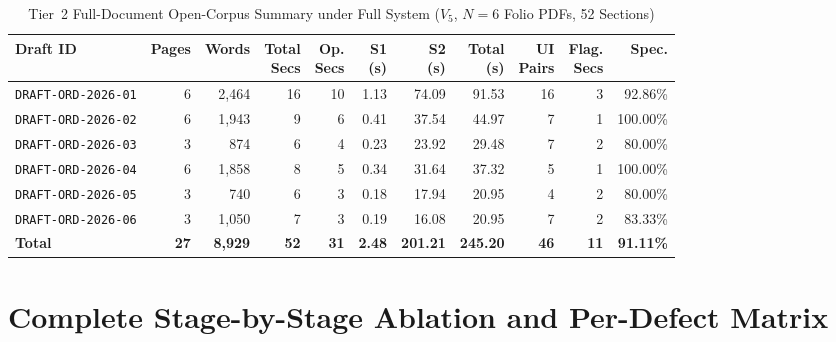 \begin{table}[htbp]
    \centering
    \scriptsize
    \setlength{\tabcolsep}{2.8pt}
    \renewcommand{\arraystretch}{0.88}
    \caption[Tier 2 Master Document-Level Open-Corpus Audit Summary]{Tier~2 Full-Document Open-Corpus Summary under Full System ($V_5$, $N = 6$ Folio PDFs, 52 Sections)}
    \label{tab:app_tier2_summary}
    \begin{tabular*}{\linewidth}{@{}l@{\extracolsep{\fill}}rrrrrrrrrr@{}}
        \toprule
        \textbf{Draft ID} & \textbf{Pages} & \textbf{Words} & \shortstack[r]{\textbf{Total}\\\textbf{Secs}} & \shortstack[r]{\textbf{Op.}\\\textbf{Secs}} & \shortstack[r]{\textbf{S1}\\\textbf{(s)}} & \shortstack[r]{\textbf{S2}\\\textbf{(s)}} & \shortstack[r]{\textbf{Total}\\\textbf{(s)}} & \shortstack[r]{\textbf{UI}\\\textbf{Pairs}} & \shortstack[r]{\textbf{Flag.}\\\textbf{Secs}} & \textbf{Spec.} \\
        \midrule
        \texttt{DRAFT-ORD-2026-01} & 6 & 2,464 & 16 & 10 & 1.13 & 74.09 & 91.53 & 16 & 3 & 92.86\% \\
        \texttt{DRAFT-ORD-2026-02} & 6 & 1,943 & 9 & 6 & 0.41 & 37.54 & 44.97 & 7 & 1 & 100.00\% \\
        \texttt{DRAFT-ORD-2026-03} & 3 & 874 & 6 & 4 & 0.23 & 23.92 & 29.48 & 7 & 2 & 80.00\% \\
        \texttt{DRAFT-ORD-2026-04} & 6 & 1,858 & 8 & 5 & 0.34 & 31.64 & 37.32 & 5 & 1 & 100.00\% \\
        \texttt{DRAFT-ORD-2026-05} & 3 & 740 & 6 & 3 & 0.18 & 17.94 & 20.95 & 4 & 2 & 80.00\% \\
        \texttt{DRAFT-ORD-2026-06} & 3 & 1,050 & 7 & 3 & 0.19 & 16.08 & 20.95 & 7 & 2 & 83.33\% \\
        \midrule
        \textbf{Total} & \textbf{27} & \textbf{8,929} & \textbf{52} & \textbf{31} & \textbf{2.48} & \textbf{201.21} & \textbf{245.20} & \textbf{46} & \textbf{11} & \textbf{91.11\%} \\
        \bottomrule
    \end{tabular*}
\end{table}

\section{Complete Stage-by-Stage Ablation and Per-Defect Matrix}
\label{sec:app_tier2_ablation_full}


